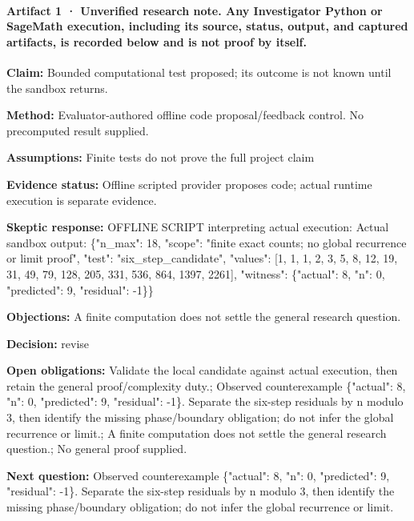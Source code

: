 \documentclass[11pt]{article}
\begin{document}
\paragraph{Artifact 1 · Unverified research note. Any Investigator Python or SageMath execution, including its source, status, output, and captured artifacts, is recorded below and is not proof by itself.}
\textbf{Claim:} Bounded computational test proposed; its outcome is not known until the sandbox returns.\par
\textbf{Method:} Evaluator-authored offline code proposal/feedback control. No precomputed result supplied.\par
\textbf{Assumptions:} Finite tests do not prove the full project claim\par
\textbf{Evidence status:} Offline scripted provider proposes code; actual runtime execution is separate evidence.\par
\textbf{Skeptic response:} OFFLINE SCRIPT interpreting actual execution: Actual sandbox output: \{"n\_max": 18, "scope": "finite exact counts; no global recurrence or limit proof", "test": "six\_step\_candidate", "values": [1, 1, 1, 2, 3, 5, 8, 12, 19, 31, 49, 79, 128, 205, 331, 536, 864, 1397, 2261], "witness": \{"actual": 8, "n": 0, "predicted": 9, "residual": -1\}\}\par
\textbf{Objections:} A finite computation does not settle the general research question.\par
\textbf{Decision:} revise\par
\textbf{Open obligations:} Validate the local candidate against actual execution, then retain the general proof/complexity duty.; Observed counterexample \{"actual": 8, "n": 0, "predicted": 9, "residual": -1\}. Separate the six-step residuals by n modulo 3, then identify the missing phase/boundary obligation; do not infer the global recurrence or limit.; A finite computation does not settle the general research question.; No general proof supplied.\par
\textbf{Next question:} Observed counterexample \{"actual": 8, "n": 0, "predicted": 9, "residual": -1\}. Separate the six-step residuals by n modulo 3, then identify the missing phase/boundary obligation; do not infer the global recurrence or limit.\par
\end{document}
